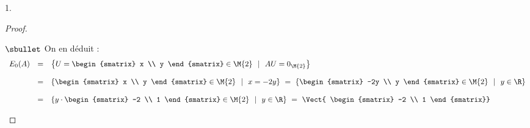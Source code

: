 \documentclass[11pt]{article}%
\begin{document}
\begin{noliste}{1.}
\begin{proof}
\begin{noliste}{$\sbullet$}
      \noindent
      On en déduit : %
      \[
      \begin{array}{rcl}
        E_{0}(A) & = & 
        \left\{%
          U =
          \begin{smatrix}
            x \\
            y
          \end{smatrix}
          \in \M{2}
          \ \ | \ \ 
          AU = 0_{\M{2}}
        \right\}
        \\[.4cm]
        & = & 
        \left\{%
          \begin{smatrix}
            x \\
            y
          \end{smatrix}
          \in \M{2}
          \ \ | \ \ 
          x = -2y
        \right\} 
        \ = \
        \left\{%
          \begin{smatrix}
            -2y \\
            y
          \end{smatrix}
          \in \M{2}
          \ \ | \ \ 
          y \in \R
        \right\} 
        \\[.4cm]
        & = & 
        \left\{%
          y \cdot
          \begin{smatrix}
            -2 \\
            1
          \end{smatrix}
          \in \M{2}
          \ \ | \ \ 
          y \in \R
        \right\} 
        \ = \ \Vect{
          \begin{smatrix}
            -2 \\
            1
          \end{smatrix}}
      \end{array} 
      \]
      

\end{noliste}
\end{proof}
\end{noliste}
\end{document}
